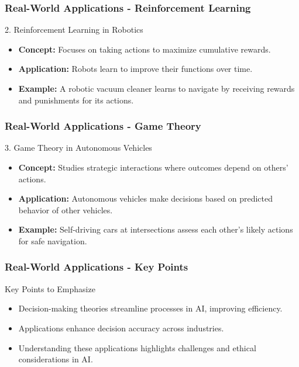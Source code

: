 \documentclass[aspectratio=169]{beamer}
\begin{document}
\begin{frame}[fragile]
    \frametitle{Real-World Applications - Reinforcement Learning}
    \begin{block}{2. Reinforcement Learning in Robotics}
        \begin{itemize}
            \item \textbf{Concept:} Focuses on taking actions to maximize cumulative rewards.
            \item \textbf{Application:} Robots learn to improve their functions over time.
            \item \textbf{Example:} A robotic vacuum cleaner learns to navigate by receiving rewards and punishments for its actions.
        \end{itemize}
    \end{block}
\end{frame}

\begin{frame}[fragile]
    \frametitle{Real-World Applications - Game Theory}
    \begin{block}{3. Game Theory in Autonomous Vehicles}
        \begin{itemize}
            \item \textbf{Concept:} Studies strategic interactions where outcomes depend on others' actions.
            \item \textbf{Application:} Autonomous vehicles make decisions based on predicted behavior of other vehicles.
            \item \textbf{Example:} Self-driving cars at intersections assess each other's likely actions for safe navigation.
        \end{itemize}
    \end{block}
\end{frame}

\begin{frame}[fragile]
    \frametitle{Real-World Applications - Key Points}
    \begin{block}{Key Points to Emphasize}
        \begin{itemize}
            \item Decision-making theories streamline processes in AI, improving efficiency.
            \item Applications enhance decision accuracy across industries.
            \item Understanding these applications highlights challenges and ethical considerations in AI.
        \end{itemize}
    \end{block}
\end{frame}
\end{document}
